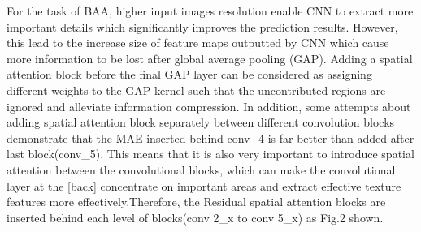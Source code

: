 \documentclass{article}
\makeatletter
\newcommand{\tabincell}[2]{\begin{tabular}{@{}#1@{}}#2\end{tabular}}
\makeatother
\begin{document}
For the task of BAA, higher input images resolution enable CNN to extract more important details which significantly improves the prediction results. However, this lead to the increase size of feature maps outputted by CNN which cause more information to be lost after global average pooling (GAP). Adding a spatial attention block before the final GAP layer can be considered as assigning different weights to the GAP kernel such that the uncontributed regions are ignored and alleviate information compression. In addition, some attempts about adding spatial attention block separately between different convolution blocks demonstrate that the MAE inserted behind conv\_4 is far better than added after last block(conv\_5). This means that it is also very important to introduce spatial attention between the convolutional blocks, which can make the convolutional layer at the [back] concentrate on important areas and extract effective texture features more effectively.Therefore, the Residual spatial attention blocks are inserted behind each level of blocks(conv 2\_x to conv 5\_x) as Fig.2 shown.

\end{document}
